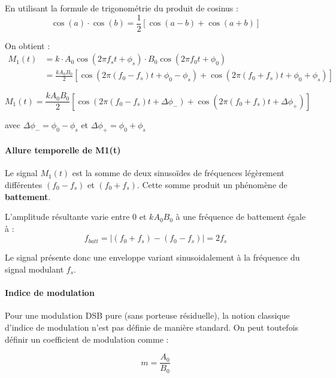 \documentclass[11pt,a4paper]{article}
\begin{document}
En utilisant la formule de trigonométrie du produit de cosinus :
\begin{equation}
\cos(a) \cdot \cos(b) = \frac{1}{2}[\cos(a-b) + \cos(a+b)]
\end{equation}

On obtient :
\begin{align}
M_1(t) &= k \cdot A_0 \cos(2\pi f_s t + \phi_s) \cdot B_0 \cos(2\pi f_0 t + \phi_0) \\
&= \frac{k A_0 B_0}{2} [\cos(2\pi(f_0 - f_s)t + \phi_0 - \phi_s) + \cos(2\pi(f_0 + f_s)t + \phi_0 + \phi_s)]
\end{align}

\begin{equation}
\boxed{M_1(t) = \frac{k A_0 B_0}{2} [\cos(2\pi(f_0 - f_s)t + \Delta\phi_-) + \cos(2\pi(f_0 + f_s)t + \Delta\phi_+)]}
\end{equation}

avec $\Delta\phi_- = \phi_0 - \phi_s$ et $\Delta\phi_+ = \phi_0 + \phi_s$

\paragraph{Allure temporelle de M1(t)}

Le signal $M_1(t)$ est la somme de deux sinusoïdes de fréquences légèrement différentes $(f_0 - f_s)$ et $(f_0 + f_s)$. Cette somme produit un phénomène de \textbf{battement}.

L'amplitude résultante varie entre 0 et $k A_0 B_0$ à une fréquence de battement égale à :
\begin{equation}
f_{batt} = |(f_0 + f_s) - (f_0 - f_s)| = 2f_s
\end{equation}

Le signal présente donc une enveloppe variant sinusoidalement à la fréquence du signal modulant $f_s$.

\paragraph{Indice de modulation}

Pour une modulation DSB pure (sans porteuse résiduelle), la notion classique d'indice de modulation n'est pas définie de manière standard. On peut toutefois définir un coefficient de modulation comme :

\begin{equation}
\boxed{m = \frac{A_0}{B_0}}
\end{equation}
\end{document}
